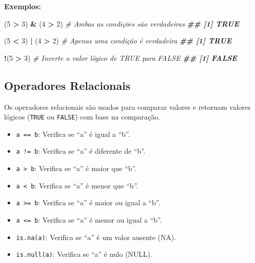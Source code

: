 \documentclass[
]{book}
\newenvironment{Shaded}{\begin{snugshade}}{\end{snugshade}}
\newcommand{\CommentTok}[1]{\textcolor[rgb]{0.56,0.35,0.01}{\textit{#1}}}
\newcommand{\DecValTok}[1]{\textcolor[rgb]{0.00,0.00,0.81}{#1}}
\newcommand{\DocumentationTok}[1]{\textcolor[rgb]{0.56,0.35,0.01}{\textbf{\textit{#1}}}}
\newcommand{\NormalTok}[1]{#1}
\newcommand{\SpecialCharTok}[1]{\textcolor[rgb]{0.81,0.36,0.00}{\textbf{#1}}}
\providecommand{\tightlist}{%
  \setlength{\itemsep}{0pt}\setlength{\parskip}{0pt}}
\begin{document}
\textbf{Exemplos:}

\begin{Shaded}
\begin{Highlighting}[]
\NormalTok{(}\DecValTok{5} \SpecialCharTok{\textgreater{}} \DecValTok{3}\NormalTok{) }\SpecialCharTok{\&}\NormalTok{ (}\DecValTok{4} \SpecialCharTok{\textgreater{}} \DecValTok{2}\NormalTok{)   }\CommentTok{\# Ambas as condições são verdadeiras}
\DocumentationTok{\#\# [1] TRUE}

\NormalTok{(}\DecValTok{5} \SpecialCharTok{\textless{}} \DecValTok{3}\NormalTok{) }\SpecialCharTok{|}\NormalTok{ (}\DecValTok{4} \SpecialCharTok{\textgreater{}} \DecValTok{2}\NormalTok{)   }\CommentTok{\# Apenas uma condição é verdadeira}
\DocumentationTok{\#\# [1] TRUE}

\SpecialCharTok{!}\NormalTok{(}\DecValTok{5} \SpecialCharTok{\textgreater{}} \DecValTok{3}\NormalTok{)            }\CommentTok{\# Inverte o valor lógico de TRUE para FALSE}
\DocumentationTok{\#\# [1] FALSE}
\end{Highlighting}
\end{Shaded}

\subsection{Operadores Relacionais}\label{operadores-relacionais}

Os operadores relacionais são usados para comparar valores e retornam
valores lógicos (\texttt{TRUE} ou \texttt{FALSE}) com base na comparação.

\begin{itemize}
\tightlist
\item
  \texttt{a\ ==\ b}: Verifica se ``a'' é igual a ``b''.
\item
  \texttt{a\ !=\ b}: Verifica se ``a'' é diferente de ``b''.
\item
  \texttt{a\ \textgreater{}\ b}: Verifica se ``a'' é maior que ``b''.
\item
  \texttt{a\ \textless{}\ b}: Verifica se ``a'' é menor que ``b''.
\item
  \texttt{a\ \textgreater{}=\ b}: Verifica se ``a'' é maior ou igual a ``b''.
\item
  \texttt{a\ \textless{}=\ b}: Verifica se ``a'' é menor ou igual a ``b''.
\item
  \texttt{is.na(a)}: Verifica se ``a'' é um valor ausente (NA).
\item
  \texttt{is.null(a)}: Verifica se ``a'' é nulo (NULL).
\end{itemize}
\end{document}
